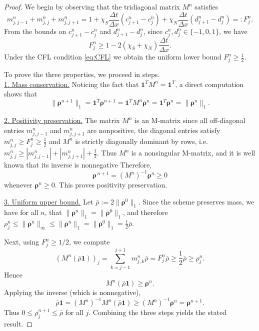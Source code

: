\documentclass[11pt,twoside]{article}
\theoremstyle{nonumberplain}
\newtheorem{proof}[theorem]{Proof}
\newcommand{\brho}{\boldsymbol{\rho}}
\begin{document}
{\begin{proof}
We begin by observing that the tridiagonal matrix $M^n$ satisfies
\[
m_{j,j-1}^n + m_{j,j}^n + m_{j,j+1}^n
= 1 + \chi_S \frac{\Delta t}{\Delta x} (c_{j+1}^n - c_j^n)
      + \chi_N \frac{\Delta t}{\Delta x} (d_{j+1}^n - d_j^n)
=: F_j^n .
\]
From the bounds on $c_{j+1}^n - c_j^n$ and $d_{j+1}^n - d_j^n$, since  $c_j^n, d_j^n \in \{-1,0,1\}$, we have 
\[
F_j^n \ge 1 - 2(\chi_S+\chi_N)\frac{\Delta t}{\Delta x}.
\]
Under the CFL condition \eqref{eq:CFL} we obtain the uniform lower bound $F_j^n \ge \frac{1}{2}$.


To prove the three properties, we proceed in steps.\\

\noindent\underline{1. Mass conservation.}
{Noticing the fact that $\mathbf{1}^T M^n = \mathbf{1}^T$, a direct computation shows that  
$$
\|\brho^{n+1}\|_1 = \mathbf{1}^T \brho^{n+1} = \mathbf{1}^T M^n  \brho^n = \mathbf{1}^T \brho^{n} = \|\brho^n\|_1.
$$}

\vspace{0.2cm}
\noindent\underline{2. Positivity preservation.}
The matrix $M^n$ is an M-matrix since all off-diagonal entries $m_{j,j-1}^n$ and $m_{j,j+1}^n$ are nonpositive, the diagonal entries satisfy $m_{j,j}^n \ge F_j^n \ge \frac{1}{2}$ and $M^n$ is strictly diagonally dominant by rows, i.e. $m_{j,j}^n \ge |m_{j,j-1}^n| + |m_{j,j+1}^n| + \frac{1}{2}$.
Thus $M^n$ is a nonsingular M-matrix, and it is well known that its inverse is nonnegative
Therefore,
\[
\brho^{\,n+1} = (M^n)^{-1} \brho^n \ge 0
\]
whenever $\brho^n \ge 0$. This proves positivity preservation.

\vspace{0.2cm}
\noindent\underline{3. Uniform upper bound.}
Let  $\bar\rho := 2\|\brho^0\|_1$.
Since the scheme preserves mass, we have for all $n$, that $\|\brho^n\|_1 = \|\brho^0\|_1$, and therefore $\rho_j^n \leq \|\brho^n \|_\infty\leq \|\brho^n\|_1 = \|\brho^0\|_1 = \frac12 \bar\rho$.


Next, using $F_j^n \ge 1/2$, we compute
\[
(M^n (\bar\rho \mathbf{1}))_j
= \sum_{k=j-1}^{j+1} m_{j,k}^n \bar\rho
= F_j^n \bar\rho
\ge \frac12 \bar\rho
\ge \rho_j^n.
\]
Hence
\[
M^n (\bar\rho \mathbf{1}) \ge \brho^n.
\]
Applying the inverse (which is nonnegative),
\[
\bar\rho \mathbf{1} = (M^n)^{-1} M^n(\bar\rho \mathbf{1})
\ge (M^n)^{-1} \brho^n = \brho^{n+1}.
\]
Thus $0 \le \rho_j^{n+1} \le \bar\rho$ for all $j$.
Combining the three steps yields the stated result.
\end{proof}








}
\end{document}
